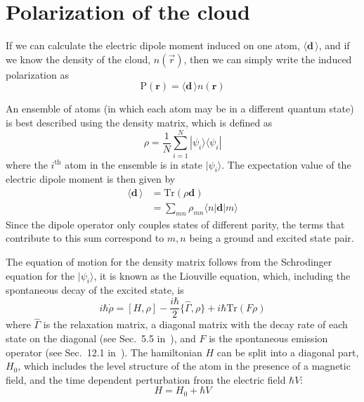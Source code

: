 \documentclass[11pt,letter]{article}
\newcommand{\bv}[1]{\ensuremath{\bm{#1}}}
\newcommand{\dpol}{\ensuremath{\bv{\mathrm{P}}}}
\begin{document}
     
    
\section{Polarization of the cloud}  


If we can calculate the electric
dipole moment induced on one atom, $\langle \bv{d}\, \rangle$, and if we know
the density of the cloud, $n(\vec{r})$, then we can simply write the induced
polarization as 
\begin{equation}
 \dpol(\bv{r}) = \langle \bv{d}\, \rangle n(\bv{r}) 
\end{equation}

An ensemble of atoms (in which each atom may be in a different quantum state) is
best described using the density matrix, which is defined as \begin{equation}
  \rho = \frac{1}{N} \sum_{i=1}^{N} | \psi_{i} \rangle \langle \psi_{i} | 
\end{equation}
where the $i^{\text{th}}$ atom in the ensemble is in state $|\psi_{i}\rangle$.
The expectation value of the electric dipole moment is then given by 
\begin{equation}
\begin{split}
   \langle \bv{d}\, \rangle  & = \text{Tr} ( \rho \bv{d} )  \\
   & = \sum_{mn} \rho_{mn} \langle n | \bv{d} | m \rangle
\end{split} 
\end{equation} 
Since the dipole operator only couples states of different parity, the terms
that contribute to this sum correspond to $m,n$ being a ground and excited
state pair.   

The equation of motion for the density matrix follows from the Schrodinger
equation for the $|\psi_{i}\rangle$,  it is known as the Liouville equation,
which, including the spontaneous decay of the excited state, 
is~\cite{auzinsh2010optically} 
\begin{equation}
  i \hbar \dot{\rho} = 
  [H, \rho] - \frac{i\hbar}{2}\lbrace \hat{\Gamma}, \rho \rbrace + i\hbar\text{Tr}( F \rho ) 
\end{equation}
where $\hat{\Gamma}$ is the relaxation matrix, a diagonal matrix with the decay
rate of each state on the diagonal (see Sec.~5.5
in~\cite{auzinsh2010optically}), and $F$ is the spontaneous emission operator
(see Sec.~12.1 in~\cite{auzinsh2010optically}).  The hamiltonian
$H$ can be split into a diagonal part, $H_{0}$, which includes the
level structure of the atom in the presence of a magnetic field, and the time
dependent perturbation from the electric field $\hbar V$:
\begin{equation}
  H = H_{0} + \hbar V
\end{equation}
\end{document}
